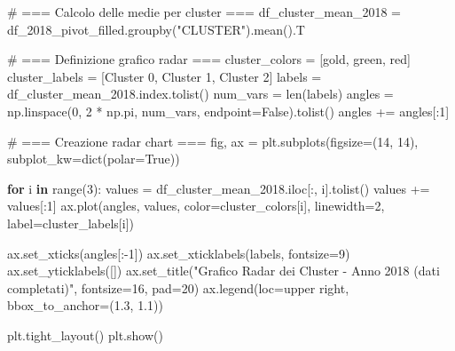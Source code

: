 \documentclass[
  letterpaper,
  DIV=11,
  numbers=noendperiod]{scrartcl}
\newenvironment{Shaded}{\begin{snugshade}}{\end{snugshade}}
\newcommand{\BuiltInTok}[1]{\textcolor[rgb]{0.00,0.23,0.31}{#1}}
\newcommand{\CommentTok}[1]{\textcolor[rgb]{0.37,0.37,0.37}{#1}}
\newcommand{\ControlFlowTok}[1]{\textcolor[rgb]{0.00,0.23,0.31}{\textbf{#1}}}
\newcommand{\DecValTok}[1]{\textcolor[rgb]{0.68,0.00,0.00}{#1}}
\newcommand{\FloatTok}[1]{\textcolor[rgb]{0.68,0.00,0.00}{#1}}
\newcommand{\KeywordTok}[1]{\textcolor[rgb]{0.00,0.23,0.31}{\textbf{#1}}}
\newcommand{\NormalTok}[1]{\textcolor[rgb]{0.00,0.23,0.31}{#1}}
\newcommand{\OperatorTok}[1]{\textcolor[rgb]{0.37,0.37,0.37}{#1}}
\newcommand{\StringTok}[1]{\textcolor[rgb]{0.13,0.47,0.30}{#1}}
\newcommand{\VariableTok}[1]{\textcolor[rgb]{0.07,0.07,0.07}{#1}}
\begin{document}
\begin{Shaded}
\begin{Highlighting}[]
\CommentTok{\# === Calcolo delle medie per cluster ===}
\NormalTok{df\_cluster\_mean\_2018 }\OperatorTok{=}\NormalTok{ df\_2018\_pivot\_filled.groupby(}\StringTok{"CLUSTER"}\NormalTok{).mean().T}

\CommentTok{\# === Definizione grafico radar ===}
\NormalTok{cluster\_colors }\OperatorTok{=}\NormalTok{ [}\StringTok{\textquotesingle{}gold\textquotesingle{}}\NormalTok{, }\StringTok{\textquotesingle{}green\textquotesingle{}}\NormalTok{, }\StringTok{\textquotesingle{}red\textquotesingle{}}\NormalTok{]}
\NormalTok{cluster\_labels }\OperatorTok{=}\NormalTok{ [}\StringTok{\textquotesingle{}Cluster 0\textquotesingle{}}\NormalTok{, }\StringTok{\textquotesingle{}Cluster 1\textquotesingle{}}\NormalTok{, }\StringTok{\textquotesingle{}Cluster 2\textquotesingle{}}\NormalTok{]}
\NormalTok{labels }\OperatorTok{=}\NormalTok{ df\_cluster\_mean\_2018.index.tolist()}
\NormalTok{num\_vars }\OperatorTok{=} \BuiltInTok{len}\NormalTok{(labels)}
\NormalTok{angles }\OperatorTok{=}\NormalTok{ np.linspace(}\DecValTok{0}\NormalTok{, }\DecValTok{2} \OperatorTok{*}\NormalTok{ np.pi, num\_vars, endpoint}\OperatorTok{=}\VariableTok{False}\NormalTok{).tolist()}
\NormalTok{angles }\OperatorTok{+=}\NormalTok{ angles[:}\DecValTok{1}\NormalTok{]}

\CommentTok{\# === Creazione radar chart ===}
\NormalTok{fig, ax }\OperatorTok{=}\NormalTok{ plt.subplots(figsize}\OperatorTok{=}\NormalTok{(}\DecValTok{14}\NormalTok{, }\DecValTok{14}\NormalTok{), subplot\_kw}\OperatorTok{=}\BuiltInTok{dict}\NormalTok{(polar}\OperatorTok{=}\VariableTok{True}\NormalTok{))}

\ControlFlowTok{for}\NormalTok{ i }\KeywordTok{in} \BuiltInTok{range}\NormalTok{(}\DecValTok{3}\NormalTok{):}
\NormalTok{    values }\OperatorTok{=}\NormalTok{ df\_cluster\_mean\_2018.iloc[:, i].tolist()}
\NormalTok{    values }\OperatorTok{+=}\NormalTok{ values[:}\DecValTok{1}\NormalTok{]}
\NormalTok{    ax.plot(angles, values, color}\OperatorTok{=}\NormalTok{cluster\_colors[i], linewidth}\OperatorTok{=}\DecValTok{2}\NormalTok{, label}\OperatorTok{=}\NormalTok{cluster\_labels[i])}

\NormalTok{ax.set\_xticks(angles[:}\OperatorTok{{-}}\DecValTok{1}\NormalTok{])}
\NormalTok{ax.set\_xticklabels(labels, fontsize}\OperatorTok{=}\DecValTok{9}\NormalTok{)}
\NormalTok{ax.set\_yticklabels([])}
\NormalTok{ax.set\_title(}\StringTok{"Grafico Radar dei Cluster {-} Anno 2018 (dati completati)"}\NormalTok{, fontsize}\OperatorTok{=}\DecValTok{16}\NormalTok{, pad}\OperatorTok{=}\DecValTok{20}\NormalTok{)}
\NormalTok{ax.legend(loc}\OperatorTok{=}\StringTok{\textquotesingle{}upper right\textquotesingle{}}\NormalTok{, bbox\_to\_anchor}\OperatorTok{=}\NormalTok{(}\FloatTok{1.3}\NormalTok{, }\FloatTok{1.1}\NormalTok{))}

\NormalTok{plt.tight\_layout()}
\NormalTok{plt.show()}
\end{Highlighting}
\end{Shaded}
\end{document}
